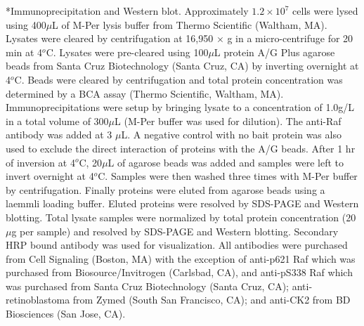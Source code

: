 \documentclass[12pt]{article}
\makeatletter
\renewcommand\subsection{\@startsection
	{subsection}{2}{0mm}
	{-0.05in}
	{-0.5\baselineskip}
	{\normalfont\normalsize\bfseries}}
\makeatother
\begin{document}
\subsection*{Immunoprecipitation and Western blot.}
Approximately $1.2 \times 10^7$ cells were lysed using 400$\mu$L of M-Per lysis buffer from Thermo Scientific (Waltham, MA). 
Lysates were cleared by centrifugation at 16,950 $\times$ g in a micro-centrifuge for 20 min at 4$^{o}$C.  
Lysates were pre-cleared using 100$\mu$L protein A/G Plus agarose beads from Santa Cruz Biotechnology (Santa Cruz, CA) by 
inverting overnight at 4$^{o}$C.  Beads were cleared by centrifugation and total protein concentration
was determined by a BCA assay (Thermo Scientific, Waltham, MA).  Immunoprecipitations were setup by bringing 
lysate to a concentration of 1.0g/L in a total volume of 300$\mu$L (M-Per buffer was used for dilution).     
The anti-Raf antibody was added at 3 $\mu$L.
A negative control with no bait protein was also used to exclude the direct interaction of proteins with the A/G beads.   
After 1 hr of inversion at 4$^{o}$C, 20$\mu$L of agarose beads was added and samples were left 
to invert overnight at 4$^{o}$C.  
Samples were then washed three times with M-Per buffer by centrifugation.
Finally proteins were eluted from agarose beads using a laemmli loading buffer.
Eluted proteins were resolved by SDS-PAGE and Western blotting.  Total 
lysate samples were normalized by total protein concentration (20$\mu$g per sample)
and resolved by SDS-PAGE and Western blotting.  Secondary HRP bound antibody was used for visualization.
All antibodies were purchased from Cell Signaling (Boston, MA) with the exception of anti-p621 Raf which was purchased from Biosource/Invitrogen  (Carlsbad, CA), and
anti-pS338 Raf which was purchased from Santa Cruz Biotechnology (Santa Cruz, CA); anti-retinoblastoma from Zymed (South San Francisco, CA); and anti-CK2 from BD Biosciences (San Jose, CA).
     
\end{document}
